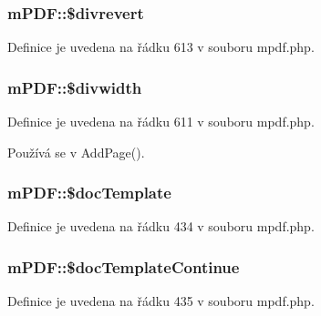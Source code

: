 \hypertarget{classm_p_d_f_aeedcf9585c7ba3338b812ea661f71719}{
\subsubsection[{\$divrevert}]{\setlength{\rightskip}{0pt plus 5cm}m\-P\-D\-F\-::\$divrevert}}\label{classm_p_d_f_aeedcf9585c7ba3338b812ea661f71719}


Definice je uvedena na řádku 613 v souboru mpdf.\-php.

\hypertarget{classm_p_d_f_a9f3b64cd9b70ea8c22844643ab29e2b8}{
\subsubsection[{\$divwidth}]{\setlength{\rightskip}{0pt plus 5cm}m\-P\-D\-F\-::\$divwidth}}\label{classm_p_d_f_a9f3b64cd9b70ea8c22844643ab29e2b8}


Definice je uvedena na řádku 611 v souboru mpdf.\-php.



Používá se v Add\-Page().

\hypertarget{classm_p_d_f_a028357454432ce31caf553838a8d8e98}{
\subsubsection[{\$doc\-Template}]{\setlength{\rightskip}{0pt plus 5cm}m\-P\-D\-F\-::\$doc\-Template}}\label{classm_p_d_f_a028357454432ce31caf553838a8d8e98}


Definice je uvedena na řádku 434 v souboru mpdf.\-php.

\hypertarget{classm_p_d_f_ae62e93cf8e2f3ff9cda57af17636810f}{
\subsubsection[{\$doc\-Template\-Continue}]{\setlength{\rightskip}{0pt plus 5cm}m\-P\-D\-F\-::\$doc\-Template\-Continue}}\label{classm_p_d_f_ae62e93cf8e2f3ff9cda57af17636810f}


Definice je uvedena na řádku 435 v souboru mpdf.\-php.

